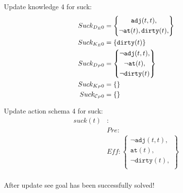 \documentclass[\master/Master.tex]{subfiles}
\begin{document}
Update knowledge 4 for suck:
  \begin{align*}
  	Suck_{D_E0} &=\left\{
  	\begin{gathered}
  		\texttt{adj}(t,t), \\					
  		\neg \texttt{at}(t), \texttt{dirty}(t), \\
  	\end{gathered}
  	\right\} \\
  	Suck_{K_E0} &=\{\texttt{dirty}(t)\} \\	
  	Suck_{D_P0} &=\left\{
  	\begin{gathered}
  		\neg \texttt{adj}(t,t), \\					
  		\neg \texttt{at}(t), \\			
  		\neg \texttt{dirty}(t) \\
  	\end{gathered}
  	\right\} \\
  	Suck_{K_P0} &=\{\} \\
  	Suck_{\mathcal{C}_P0}& =\{\} 	
  \end{align*}
  
  Update action schema 4 for suck:
\begin{align*}
	suck(t) &: \\
	& Pre : 
	\\
	& Eff : 
	\left\{
	\begin{gathered}
		\neg \texttt{adj}(t,t), \\					
		\texttt{at}(t), \\			
		\neg \texttt{dirty}(t), \\
	\end{gathered}
	\right\}
	\\
\end{align*}
  
After update see goal has been successfully solved!  
\end{document}
